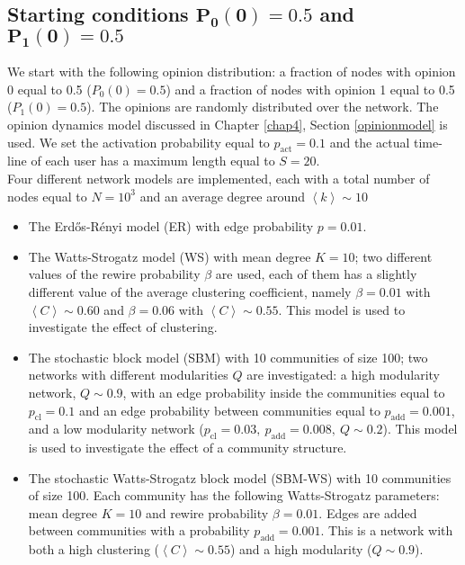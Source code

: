 \documentclass[11 pt , letterpaper , twoside , openright]{book}
\begin{document}
\subsection{Starting conditions $\bm{P_0(0) = 0.5}$ and $\bm{P_1(0)=0.5}$}
\label{50-50}
We start with the following opinion distribution: a fraction of nodes with opinion 0 equal to 0.5 ($P_0(0) = 0.5$) and a fraction of nodes with opinion 1 equal to 0.5 ($P_1(0) = 0.5$). The opinions are randomly distributed over the network. The opinion dynamics model discussed in Chapter \ref{chap4}, Section \ref{opinionmodel} %
is used. We set the activation probability equal to $p_{\text{act}} = 0.1$ and the actual time-line of each user has a maximum length equal to $S=20$.\\
\newline
Four different network models are implemented, each with a total number of nodes equal to $N = 10^3$ and an average degree around $\left<k\right> \sim 10$
\begin{itemize}
	\item The Erd\H{o}s-R\'{e}nyi model (ER) with edge probability $p = 0.01$.
	\item The Watts-Strogatz model (WS) with mean degree $K=10$; two different values of the rewire probability $\beta$ are used, each of them has a slightly different value of the average clustering coefficient, namely $\beta = 0.01$ with $\left<C\right> \sim 0.60$ and $\beta = 0.06$ with $\left<C\right> \sim 0.55$. This model is used to investigate the effect of clustering.
	\item The stochastic block model (SBM) with 10 communities of size 100; two networks with different modularities $Q$ are investigated: a high modularity network, $Q \sim 0.9$, with an edge probability inside the communities equal to $p_{\text{cl}} = 0.1$ and an edge probability between communities equal to $p_{\text{add}} = 0.001$, and a low modularity network ($p_{\text{cl}} = 0.03,\ p_{\text{add}} = 0.008,\ Q \sim 0.2$). This model is used to investigate the effect of a community structure.
	\item The stochastic Watts-Strogatz block model (SBM-WS) with 10 communities of size 100. Each community has the following Watts-Strogatz parameters: mean degree $K =10$ and rewire probability $\beta = 0.01$. Edges are added between communities with a probability $p_{\text{add}} = 0.001$. This is a network with both a high clustering ($\left<C\right> \sim 0.55$) and a high modularity ($Q \sim 0.9$).
\end{itemize}
\end{document}

